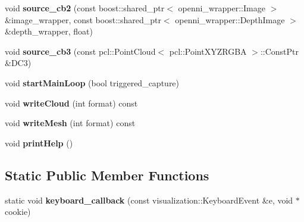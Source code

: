 \begin{DoxyCompactItemize}
\item 
\hypertarget{struct_kin_fu_l_s_app_a45662c8768244fd8b7c5431dacd87881}{void {\bfseries source\+\_\+cb2} (const boost\+::shared\+\_\+ptr$<$ openni\+\_\+wrapper\+::\+Image $>$ \&image\+\_\+wrapper, const boost\+::shared\+\_\+ptr$<$ openni\+\_\+wrapper\+::\+Depth\+Image $>$ \&depth\+\_\+wrapper, float)}\label{struct_kin_fu_l_s_app_a45662c8768244fd8b7c5431dacd87881}

\item 
\hypertarget{struct_kin_fu_l_s_app_adf886de05d76766c51d6079f8b15db9c}{void {\bfseries source\+\_\+cb3} (const pcl\+::\+Point\+Cloud$<$ pcl\+::\+Point\+X\+Y\+Z\+R\+G\+B\+A $>$\+::Const\+Ptr \&D\+C3)}\label{struct_kin_fu_l_s_app_adf886de05d76766c51d6079f8b15db9c}

\item 
\hypertarget{struct_kin_fu_l_s_app_a53d96a404961fa08811f2b6d48920782}{void {\bfseries start\+Main\+Loop} (bool triggered\+\_\+capture)}\label{struct_kin_fu_l_s_app_a53d96a404961fa08811f2b6d48920782}

\item 
\hypertarget{struct_kin_fu_l_s_app_a1d855097fedbba14e864022032cc9515}{void {\bfseries write\+Cloud} (int format) const }\label{struct_kin_fu_l_s_app_a1d855097fedbba14e864022032cc9515}

\item 
\hypertarget{struct_kin_fu_l_s_app_acec9efc09fa50d35e65b32d221e01f57}{void {\bfseries write\+Mesh} (int format) const }\label{struct_kin_fu_l_s_app_acec9efc09fa50d35e65b32d221e01f57}

\item 
\hypertarget{struct_kin_fu_l_s_app_a4c5fff246a4aaf1b703bf276c3daf51b}{void {\bfseries print\+Help} ()}\label{struct_kin_fu_l_s_app_a4c5fff246a4aaf1b703bf276c3daf51b}

\end{DoxyCompactItemize}
\subsection*{Static Public Member Functions}
\begin{DoxyCompactItemize}
\item 
\hypertarget{struct_kin_fu_l_s_app_ada8919c6a7cc2389c420a132b066f818}{static void {\bfseries keyboard\+\_\+callback} (const visualization\+::\+Keyboard\+Event \&e, void $\ast$cookie)}\label{struct_kin_fu_l_s_app_ada8919c6a7cc2389c420a132b066f818}

\end{DoxyCompactItemize}
